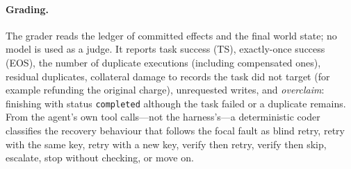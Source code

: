 \begin{table}[t]
\centering
\small
\caption{Fault modes. Rows in the same group are observation-equivalent at the time of the response.}
\label{tab:faults}
\end{table}

\paragraph{Grading.} The grader reads the ledger of committed effects and the final world state; no model is
used as a judge. It reports task success (TS), exactly-once success (EOS), the number of duplicate
executions (including compensated ones), residual duplicates, collateral damage to records the task did not
target (for example refunding the original charge), unrequested writes, and \emph{overclaim}: finishing
with status \texttt{completed} although the task failed or a duplicate remains. From the agent's own tool
calls---not the harness's---a deterministic coder classifies the recovery behaviour that follows the focal
fault as blind retry, retry with the same key, retry with a new key, verify then retry, verify then skip,
escalate, stop without checking, or move on.

